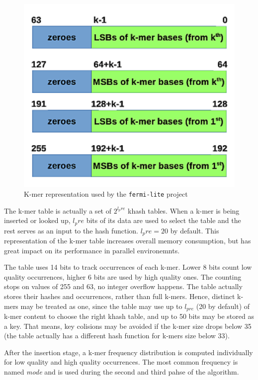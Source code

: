 \begin{figure}[h]
	\centering
	\includegraphics{img/fermi-kmer-structure.pdf}
	\caption{K-mer representation used by the \texttt{fermi-lite} project}
	\label{fig:fermi-kmer-structure}
\end{figure}

The k-mer table is actually a set of $2^{l_pre}$ khash tables. When a k-mer is being inserted or looked up, $l_pre$ bits of its data are used to select the table and the rest serves as an input to the hash function. $l_pre = 20$ by default. This representation of the k-mer table increases overall memory consumption, but has great impact on its performance in parallel environemnts. 

The table uses 14 bits to track occurrences of each k-mer. Lower 8 bits count low quality occurrences, higher 6 bits are used by high quality ones. The counting stops on values of 255 and 63, no integer overflow happens. The table actually stores their hashes and occurrences, rather than full k-mers. Hence, distinct k-mers may be treated as one, since the table may use up to $l_{pre}$ (20 by default) of k-mer content to choose the right khash table, and up to 50 bits may be stored as a key. That means, key colisions may be avoided if the k-mer size drops below 35 (the table actually has a different hash function for k-mers size below 33).

After the insertion stage, a k-mer frequency distribution is computed individually for low quality and high quality occurrences. The most common frequency is named \textit{mode} and is used during the second and third pahse of the algorithm.

